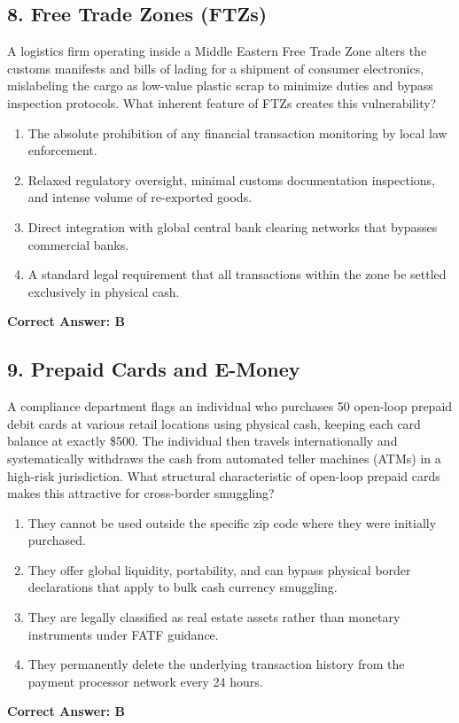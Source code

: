 \documentclass[11pt,a4paper]{article}
\begin{document}
	\subsection{8. Free Trade Zones (FTZs)}
	A logistics firm operating inside a Middle Eastern Free Trade Zone alters the customs manifests and bills of lading for a shipment of consumer electronics, mislabeling the cargo as low-value plastic scrap to minimize duties and bypass inspection protocols. What inherent feature of FTZs creates this vulnerability?
	\begin{enumerate}[label=\Alph*.]
		\item The absolute prohibition of any financial transaction monitoring by local law enforcement.
		\item Relaxed regulatory oversight, minimal customs documentation inspections, and intense volume of re-exported goods.
		\item Direct integration with global central bank clearing networks that bypasses commercial banks.
		\item A standard legal requirement that all transactions within the zone be settled exclusively in physical cash.
	\end{enumerate}
	\textbf{Correct Answer: B}
	
	\subsection{9. Prepaid Cards and E-Money}
	A compliance department flags an individual who purchases 50 open-loop prepaid debit cards at various retail locations using physical cash, keeping each card balance at exactly \$500. The individual then travels internationally and systematically withdraws the cash from automated teller machines (ATMs) in a high-risk jurisdiction. What structural characteristic of open-loop prepaid cards makes this attractive for cross-border smuggling?
	\begin{enumerate}[label=\Alph*.]
		\item They cannot be used outside the specific zip code where they were initially purchased.
		\item They offer global liquidity, portability, and can bypass physical border declarations that apply to bulk cash currency smuggling.
		\item They are legally classified as real estate assets rather than monetary instruments under FATF guidance.
		\item They permanently delete the underlying transaction history from the payment processor network every 24 hours.
	\end{enumerate}
	\textbf{Correct Answer: B}
	
\end{document}
